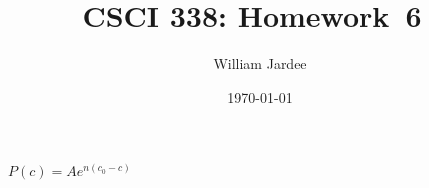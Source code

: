 \documentclass[11pt]{article}
\begin{document}
\graphicspath{{../images/}}

\title{CSCI 338: Homework~6~}
\author{William Jardee}
\date{\today}
\maketitle



$P(c) = Ae^{n(c_0 - c)}$
\end{document}

